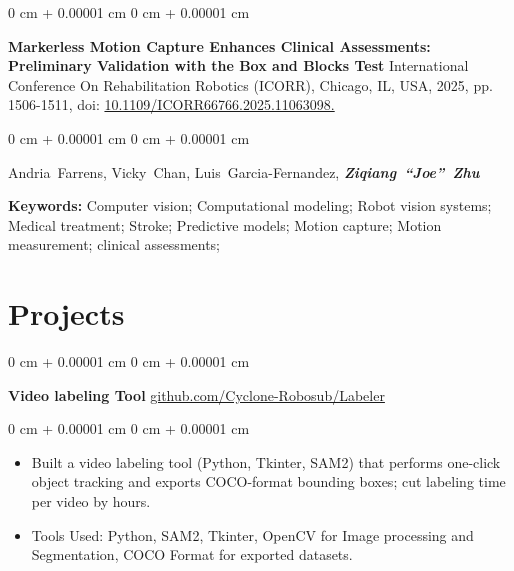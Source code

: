 \documentclass[10pt, letterpaper]{article}
\newenvironment{highlights}{
    \begin{itemize}[
        topsep=0.10 cm,
        parsep=0.10 cm,
        partopsep=0pt,
        itemsep=0pt,
        leftmargin=0 cm + 10pt
    ]
}{
    \end{itemize}
} %
\newenvironment{onecolentry}{
    \begin{adjustwidth}{
        0 cm + 0.00001 cm
    }{
        0 cm + 0.00001 cm
    }
}{
    \end{adjustwidth}
} %
\newenvironment{twocolentry}[2][]{
    \onecolentry
    \def\secondColumn{#2}
    \setcolumnwidth{\fill, 6 cm}
    \begin{paracol}{2}
}{
    \switchcolumn \raggedleft \secondColumn
    \end{paracol}
    \endonecolentry
} %
\begin{document}
        
        \begin{samepage}
            \begin{onecolentry}
                \textbf{Markerless Motion Capture Enhances Clinical Assessments: Preliminary Validation with the Box and Blocks Test} International Conference On Rehabilitation Robotics (ICORR), Chicago, IL, USA, 2025, pp. 1506-1511, doi: \href{https://doi.org/10.1109/ICORR66766.2025.11063098}{10.1109/ICORR66766.2025.11063098.}
                \label{pub:markerless-motion-capture}
            \end{onecolentry}

            \vspace{0.10 cm}
            
            \begin{onecolentry}
                \mbox{Andria Farrens}, \mbox{Vicky Chan}, \mbox{Luis Garcia-Fernandez}, \mbox{\textbf{\textit{Ziqiang “Joe” Zhu}}}

                \vspace{0.10 cm}

                \textbf{Keywords:} Computer vision; Computational modeling; Robot vision systems; Medical treatment; Stroke; Predictive models; Motion capture; Motion measurement; clinical assessments;
                
            \end{onecolentry}
            \vspace{0.10 cm}
        \end{samepage}


    
    \section{Projects}



        
        \begin{twocolentry}{
            \href{https://github.com/Cyclone-Robosub/Labeler}{github.com/Cyclone-Robosub/Labeler}
        }
            \textbf{Video labeling Tool}\end{twocolentry}

        \vspace{0.10 cm}
        \begin{onecolentry}
            \begin{highlights}
                \item Built a video labeling tool (Python, Tkinter, SAM2) that performs one-click object tracking and exports COCO-format bounding boxes; cut labeling time per video by hours.  
                \item Tools Used: Python, SAM2, Tkinter, OpenCV for Image processing and Segmentation, COCO Format for exported datasets. 
            \end{highlights}
        \end{onecolentry}
\end{document}

